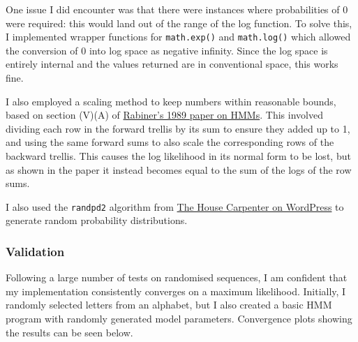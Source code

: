 \documentclass[11pt]{article} %
\begin{document}
One issue I did encounter was that there were instances where probabilities of 0 were required: this would land out of the range of the log function. To solve this, I implemented wrapper functions for \texttt{math.exp()} and \texttt{math.log()} which allowed the conversion of 0 into log space as negative infinity. Since the log space is entirely internal and the values returned are in conventional space, this works fine.

I also employed a scaling method to keep numbers within reasonable bounds, based on section (V)(A) of \href{http://dx.doi.org/10.1109/5.18626}{Rabiner's 1989 paper on HMMs}. This involved dividing each row in the forward trellis by its sum to ensure they added up to 1, and using the same forward sums to also scale the corresponding rows of the backward trellis. This causes the log likelihood in its normal form to be lost, but as shown in the paper it instead becomes equal to the sum of the logs of the row sums.

I also used the \texttt{randpd2} algorithm from \href{https://thehousecarpenter.wordpress.com/2017/02/22/generating-random-probability-distributions/}{The House Carpenter on WordPress} to generate random probability distributions.


\subsubsection{Validation}

Following a large number of tests on randomised sequences, I am confident that my implementation consistently converges on a maximum likelihood. Initially, I randomly selected letters from an alphabet, but I also created a basic HMM program with randomly generated model parameters. Convergence plots showing the results can be seen below.
\end{document}
